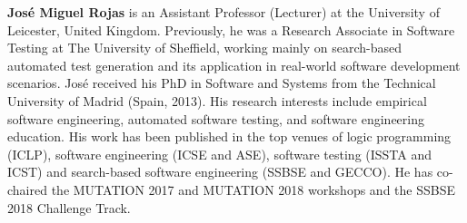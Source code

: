 \documentclass[10pt,conference]{IEEEtran}
\newcommand{\TODO}[1]{\textbf{\textcolor{ScarletRed}{[TODO: #1]}}\xspace}
\newcommand{\TODO}[1]{}
\begin{document}
{\bf Jos\'e Miguel Rojas} is an Assistant Professor (Lecturer) at the
University of Leicester, United Kingdom. Previously, he was a Research
Associate in Software Testing at The University of Sheffield, working
mainly on search-based automated test generation and its application
in real-world software development scenarios. Jos\'e received his PhD
in Software and Systems from the Technical University of Madrid
(Spain, 2013). His research interests include empirical software
engineering, automated software testing, and software engineering
education. His work has been published in the top venues of logic
programming (ICLP), software engineering (ICSE and ASE), software
testing (ISSTA and ICST) and search-based software engineering (SSBSE
and GECCO). He has co-chaired the MUTATION 2017 and MUTATION 2018
workshops and the SSBSE 2018 Challenge Track.








\end{document}
